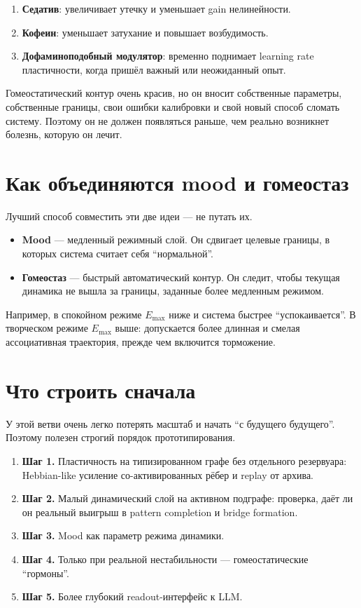 \begin{enumerate}
\item \textbf{Седатив}: увеличивает утечку и уменьшает gain нелинейности.
\item \textbf{Кофеин}: уменьшает затухание и повышает возбудимость.
\item \textbf{Дофаминоподобный модулятор}: временно поднимает learning rate пластичности,
когда пришёл важный или неожиданный опыт.
\end{enumerate}

\begin{pitfall}
Гомеостатический контур очень красив, но он вносит собственные параметры, собственные
границы, свои ошибки калибровки и свой новый способ сломать систему. Поэтому он не
должен появляться раньше, чем реально возникнет болезнь, которую он лечит.
\end{pitfall}

\section{Как объединяются mood и гомеостаз}

Лучший способ совместить эти две идеи — не путать их.

\begin{itemize}
\item \textbf{Mood} — медленный режимный слой. Он сдвигает целевые границы, в которых
система считает себя ``нормальной''.
\item \textbf{Гомеостаз} — быстрый автоматический контур. Он следит, чтобы текущая
динамика не вышла за границы, заданные более медленным режимом.
\end{itemize}

Например, в спокойном режиме $E_{\max}$ ниже и система быстрее ``успокаивается''. В
творческом режиме $E_{\max}$ выше: допускается более длинная и смелая ассоциативная
траектория, прежде чем включится торможение.

\section{Что строить сначала}

У этой ветви очень легко потерять масштаб и начать ``с будущего будущего''. Поэтому
полезен строгий порядок прототипирования.

\begin{enumerate}
\item \textbf{Шаг 1.} Пластичность на типизированном графе без отдельного резервуара:
Hebbian-like усиление со-активированных рёбер и replay от архива.
\item \textbf{Шаг 2.} Малый динамический слой на активном подграфе: проверка, даёт ли
он реальный выигрыш в pattern completion и bridge formation.
\item \textbf{Шаг 3.} Mood как параметр режима динамики.
\item \textbf{Шаг 4.} Только при реальной нестабильности — гомеостатические ``гормоны''.
\item \textbf{Шаг 5.} Более глубокий readout-интерфейс к LLM.
\end{enumerate}

